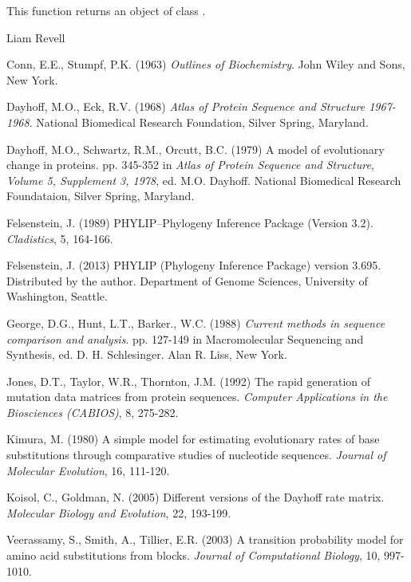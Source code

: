 \documentclass[a4paper]{book}
\begin{document}
%
\begin{Value}
This function returns an object of class .
\end{Value}
%
\begin{Author}\relax
Liam Revell 
\end{Author}
%
\begin{References}\relax
Conn, E.E., Stumpf, P.K. (1963) \emph{Outlines of Biochemistry}. John Wiley and Sons, New York. 

Dayhoff, M.O., Eck, R.V. (1968) \emph{Atlas of Protein Sequence and Structure 1967-1968}. National Biomedical Research Foundation, Silver Spring, Maryland.

Dayhoff, M.O., Schwartz, R.M., Orcutt, B.C. (1979) A model of evolutionary change in proteins. pp. 345-352 in \emph{Atlas of Protein Sequence and Structure, Volume 5, Supplement 3, 1978}, ed. M.O. Dayhoff. National Biomedical Research Foundataion, Silver Spring, Maryland.

Felsenstein, J. (1989) PHYLIP--Phylogeny Inference Package (Version 3.2). \emph{Cladistics}, 5, 164-166.

Felsenstein, J. (2013) PHYLIP (Phylogeny Inference Package) version 3.695. Distributed by the author. Department of Genome Sciences, University of Washington, Seattle.

George, D.G., Hunt, L.T., Barker., W.C. (1988) \emph{Current methods in sequence comparison and analysis}. pp. 127-149 in Macromolecular Sequencing and Synthesis, ed. D. H. Schlesinger. Alan R. Liss, New York. 

Jones, D.T., Taylor, W.R., Thornton, J.M. (1992) The rapid generation of mutation data matrices from protein sequences. \emph{Computer Applications in the Biosciences (CABIOS)}, 8, 275-282.

Kimura, M. (1980) A simple model for estimating evolutionary rates of base substitutions through comparative studies of nucleotide sequences. \emph{Journal of Molecular Evolution}, 16, 111-120.

Koisol, C., Goldman, N. (2005) Different versions of the Dayhoff rate matrix. \emph{Molecular Biology and Evolution}, 22, 193-199.

Veerassamy, S., Smith, A., Tillier, E.R. (2003) A transition probability model for amino acid substitutions from blocks. \emph{Journal of Computational Biology}, 10, 997-1010.
\end{References}
%
\begin{SeeAlso}\relax
{}
\end{SeeAlso}
\end{document}
